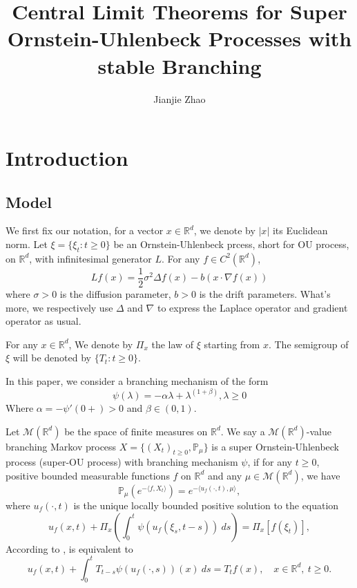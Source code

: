 \documentclass{article}
\title{Central Limit Theorems for Super Ornstein-Uhlenbeck Processes with stable Branching}
\author{Jianjie Zhao }
\begin{document}
\makeatletter
{}
\makeatother
\renewcommand{\theequation}{\arabic{section}.\arabic{equation}}

\maketitle

\section{Introduction}
\subsection{Model}

We first fix our notation, for a vector $x\in \mathbb{R}^d$, we denote by $|x|$  its Euclidean norm. Let $\xi=\{\xi_t : t\geq 0\}$ be an Ornstein-Uhlenbeck prcess, short for OU process, on $\mathbb{R}^d$, with infinitesimal generator $L$. For any $f \in C^2(\mathbb{R}^d)$,
\begin{equation}\label{generatior}
Lf(x)= \frac{1}{2}\sigma^2\Delta f(x)-b (x \cdot \nabla f(x))   
\end{equation}
where $\sigma>0$ is the diffusion parameter, $b>0$ is the drift parameters. What's more, we respectively use $\Delta$ and $\nabla$ to express the Laplace operator and gradient operator as usual.  

For any $x\in \mathbb{R}^d$, We denote by $\Pi_x$ the law of $\xi$ starting from $x$. The semigroup of $\xi$ will be denoted by $\{T_t: t\geq 0\}$.

In this paper, we consider a branching mechanism of the form  
\begin{equation}\label{mechanism}
\psi(\lambda)=-\alpha \lambda + \lambda^{(1+\beta)}, \lambda \geq 0
\end{equation}
Where $\alpha = -\psi'(0+)>0$ and $\beta \in (0,1) $.

Let $\mathcal{M}(\mathbb{R}^d)$ be the space of finite measures on $\mathbb{R}^d$. We say a $\mathcal{M}(\mathbb{R}^d)$-value branching Markov process $X=\{(X_t)_{t\geq 0},\mathbb{P}_{\mu}\}$ is a super Ornstein-Uhlenbeck process (super-OU process) with branching mechanism $\psi$, if for any $t \geq 0$, positive bounded measurable functions $f$ on $\mathbb{R}^d$ and any $\mu \in \mathcal{M}(\mathbb{R}^d)$, we have 
\begin{equation} \label{super}
    \mathbb{P}_{\mu}(e^{-\langle f,X_t \rangle})=e^{-\langle u_f(\cdot , t), \mu \rangle},
\end{equation}
where  $u_f(\cdot , t)$ is the unique locally bounded positive solution to the equation
\begin{equation}\label{eq1}
     u_f(x , t) + \Pi_x \left( \int_0^t\psi(u_f(\xi_s,t-s))~ds\right) =\Pi_x [f(\xi_t)],
\end{equation}
According to \cite[section 2]{ZL}, is equivalent to
\begin{equation}\label{eq2}
     u_f(x , t) + \int_0^t T_{t-s}\psi(u_f(\cdot,s))(x)~ds=T_tf(x),\quad x \in \mathbb{R}^d,~ t\geq 0.
\end{equation}
\end{document}
